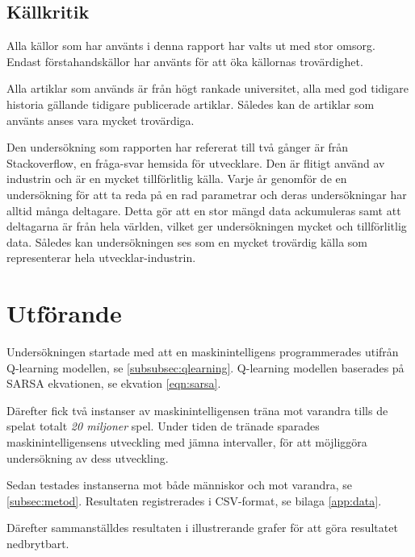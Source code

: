 \documentclass[12pt,a4paper]{article}
\begin{document}
    \subsection{Källkritik}\label{subsec:kallkritik}
      Alla källor som har använts i denna rapport har valts ut med stor omsorg. Endast förstahandskällor har använts för att öka källornas trovärdighet. 

      Alla artiklar som används är från högt rankade universitet, alla med god tidigare historia gällande tidigare publicerade artiklar. Således kan de artiklar som använts anses vara mycket trovärdiga. 

      Den undersökning som rapporten har refererat till två gånger är från Stackoverflow, en fråga-svar hemsida för utvecklare. Den är flitigt använd av industrin och är en mycket tillförlitlig källa. Varje år genomför de en undersökning för att ta reda på en rad parametrar och deras undersökningar har alltid många deltagare. Detta gör att en stor mängd data ackumuleras samt att deltagarna är från hela världen, vilket ger undersökningen mycket och tillförlitlig data. Således kan undersökningen ses som en mycket trovärdig källa som representerar hela utvecklar-industrin.


  \cleardoublepage


  \section{Utförande}\label{sec:utforande}
    Undersökningen startade med att en maskinintelligens programmerades utifrån
    Q-learning modellen, se \ref{subsubsec:qlearning}. Q-learning modellen
    baserades på SARSA ekvationen, se ekvation \ref{eqn:sarsa}.
    
    Därefter fick två instanser av maskinintelligensen träna mot varandra tills de spelat totalt \emph{20 miljoner} spel. Under tiden de tränade sparades maskinintelligensens utveckling med jämna intervaller, för att möjliggöra undersökning av dess utveckling.
    
    Sedan testades instanserna mot både människor och mot varandra, se \ref{subsec:metod}. Resultaten registrerades i CSV-format, se bilaga \ref{app:data}.

    Därefter sammanställdes resultaten i illustrerande grafer för att göra resultatet nedbrytbart.


  \cleardoublepage
\end{document}
